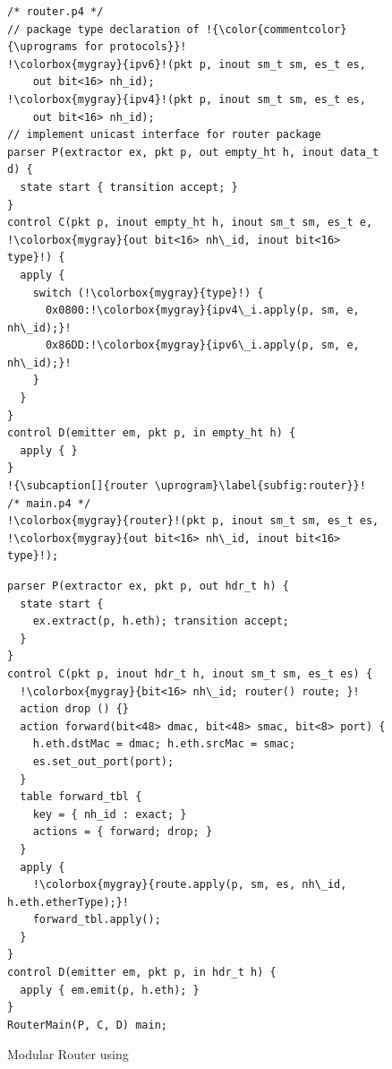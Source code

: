 \documentclass[letterpaper,twocolumn,10pt]{article}
\begin{document}



\begin{figure}[!ht]
\noindent \begin{minipage}[t]{.50\textwidth}
\begin{lstlisting}[frame=none, escapechar=!]
/* router.p4 */
// package type declaration of !{\color{commentcolor}{\uprograms for protocols}}! 
!\colorbox{mygray}{ipv6}!(pkt p, inout sm_t sm, es_t es, 
    out bit<16> nh_id);
!\colorbox{mygray}{ipv4}!(pkt p, inout sm_t sm, es_t es, 
    out bit<16> nh_id);
// implement unicast interface for router package
parser P(extractor ex, pkt p, out empty_ht h, inout data_t d) {
  state start { transition accept; }
}
control C(pkt p, inout empty_ht h, inout sm_t sm, es_t e, !\colorbox{mygray}{out bit<16> nh\_id, inout bit<16> type}!) {
  apply {
    switch (!\colorbox{mygray}{type}!) {
      0x0800:!\colorbox{mygray}{ipv4\_i.apply(p, sm, e, nh\_id);}!
      0x86DD:!\colorbox{mygray}{ipv6\_i.apply(p, sm, e, nh\_id);}!
    }
  }
}
control D(emitter em, pkt p, in empty_ht h) {
  apply { }
}
!{\subcaption[]{router \uprogram}\label{subfig:router}}!
/* main.p4 */
!\colorbox{mygray}{router}!(pkt p, inout sm_t sm, es_t es, !\colorbox{mygray}{out bit<16> nh\_id, inout bit<16> type}!);
\end{lstlisting}%
\end{minipage}\hspace{-4pt}\vline
\hfill\begin{minipage}[t]{.50\textwidth}
\begin{lstlisting}[frame=none, escapechar=!]
parser P(extractor ex, pkt p, out hdr_t h) {
  state start {
    ex.extract(p, h.eth); transition accept;
  }
}
control C(pkt p, inout hdr_t h, inout sm_t sm, es_t es) {
  !\colorbox{mygray}{bit<16> nh\_id; router() route; }!
  action drop () {}           
  action forward(bit<48> dmac, bit<48> smac, bit<8> port) {
    h.eth.dstMac = dmac; h.eth.srcMac = smac;
    es.set_out_port(port);
  }
  table forward_tbl {
    key = { nh_id : exact; } 
    actions = { forward; drop; }
  }
  apply {
    !\colorbox{mygray}{route.apply(p, sm, es, nh\_id, h.eth.etherType);}!
    forward_tbl.apply(); 
  }
}
control D(emitter em, pkt p, in hdr_t h) {
  apply { em.emit(p, h.eth); }
}
RouterMain(P, C, D) main;
\end{lstlisting}
\label{subfig:router-main}
\end{minipage}
\caption[]{Modular Router using \uarch \footnotemark}
\label{fig:modular-router}
\end{figure}
\end{document}
